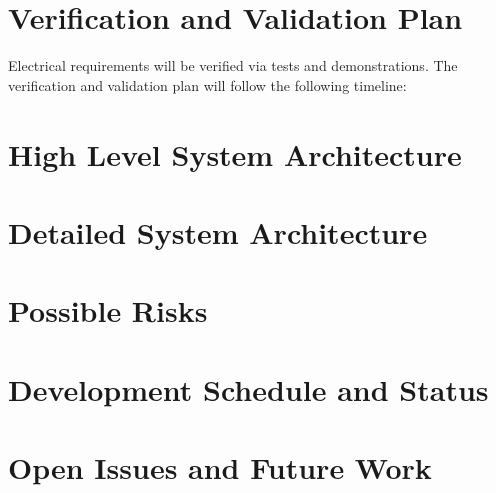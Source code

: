 \documentclass[12pt,a4paper]{article}
\begin{document}
   
    
    \section{Verification and Validation Plan}\label{sec:verifcation_validation}
    Electrical requirements will be verified via tests and demonstrations. The verification and validation plan will follow the following timeline:
    


    \section{High Level System Architecture}

    \section{Detailed System Architecture}

    \section{Possible Risks}

    \section{Development Schedule and Status}

    \section{Open Issues and Future Work}
    
            
    \newpage


\end{document}
